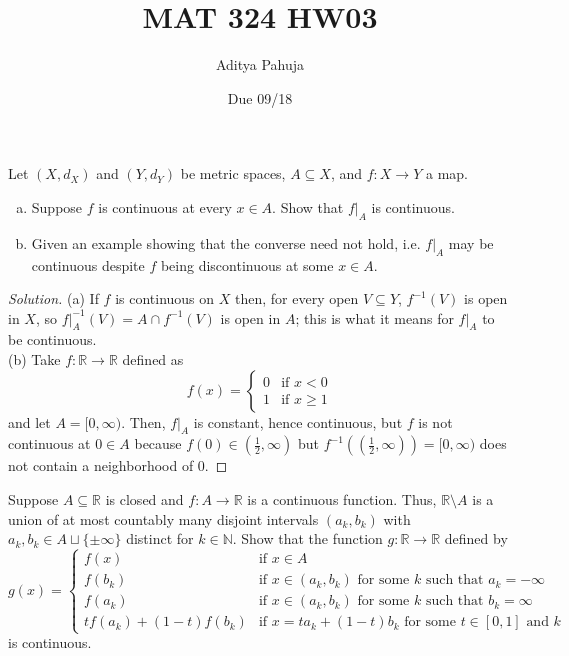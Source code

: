 \documentclass[10pt]{article}
\title{MAT 324 HW03}
\author{\large Aditya Pahuja}
\date{\large Due 09/18}
\providecommand{\half}{\frac{1}{2}}
\providecommand{\NN}{\mathbb N}
\providecommand{\RR}{\mathbb R}
\providecommand{\ii}{\item}
\providecommand{\inv}{^{-1}}
\newenvironment{soln}{\begin{proof}[Solution]}{\end{proof}}
\begin{document}
\maketitle

\begin{problem}
    Let $(X,d_X)$ and $(Y,d_Y)$ be metric spaces, $A\subseteq X$,
    and $f\colon X\to Y$ a map.
    \begin{enumerate}[(a)]
        \ii Suppose $f$ is continuous at every $x\in A$.
	Show that $f|_A$ is continuous.
	\ii Given an example showing that the converse need not hold,
	i.e. $f|_A$ may be continuous despite $f$ being discontinuous
	at some $x\in A$.
    \end{enumerate}
\end{problem}

\begin{soln}
    (a) If $f$ is continuous on $X$ then, for every open $V\subseteq Y$,
    $f\inv(V)$ is open in $X$, so
    $f|_A\inv(V) = A\cap f\inv(V)$ is open in $A$;
    this is what it means for $f|_A$ to be continuous.\\

    (b) Take $f\colon\RR\to\RR$ defined as
    \begin{equation*}
        f(x) = \begin{cases}
	    0 & \text{if }x<0\\
	    1 & \text{if }x\ge1
        \end{cases}
    \end{equation*}
    and let $A = [0,\infty)$. Then, $f|_A$ is constant, hence continuous,
    but $f$ is not continuous at $0\in A$ because $f(0)\in(\half,\infty)$ but
    $f\inv((\half,\infty)) = [0,\infty)$ does not contain a neighborhood of $0$.
\end{soln}

\begin{problem}
    Suppose $A\subseteq\RR$ is closed and $f\colon A\to\RR$ is a continuous function.
    Thus, $\RR\setminus A$ is a union of at most countably many disjoint intervals
    $(a_k,b_k)$ with $a_k,b_k\in A\sqcup\{\pm\infty\}$ distinct for $k\in\NN$.
    Show that the function $g\colon\RR\to\RR$ defined by
    \begin{equation*}
	g(x) = \begin{cases}
	    f(x) & \text{if }x\in A\\
	    f(b_k) & \text{if }x\in(a_k,b_k)\text{ for some }k
	    \text{ such that }a_k=-\infty\\
	    f(a_k) & \text{if }x\in(a_k,b_k)\text{ for some }k
	    \text{ such that }b_k=\infty\\
	    tf(a_k) + (1-t)f(b_k) & \text{if }x = ta_k + (1-t)b_k
	    \text{ for some }t\in[0,1]\text{ and }k
	\end{cases}
    \end{equation*}
    is continuous.
\end{problem}
\end{document}
